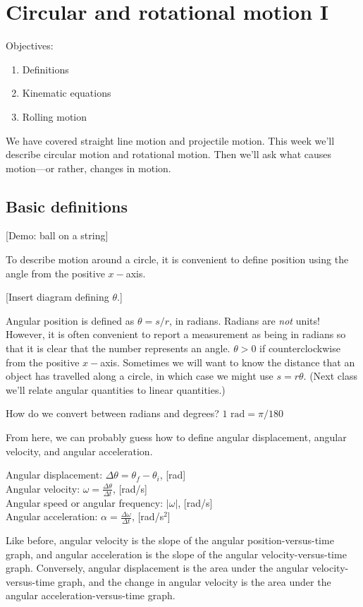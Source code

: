 \section{Circular and rotational motion I}
Objectives:
\begin{enumerate}
\item Definitions
\item Kinematic equations
\item Rolling motion
\end{enumerate}

We have covered straight line motion and projectile motion. This week we'll describe circular motion and rotational motion. Then we'll ask what causes motion---or rather, changes in motion.

\subsection{Basic definitions}
[Demo: ball on a string]

To describe motion around a circle, it is convenient to define position using the angle from the positive $x-$axis.

[Insert diagram defining $\theta$.]
\vspace{5cm}

Angular position is defined as $\theta=s/r$, in radians. Radians are \textit{not} units! However, it is often convenient to report a measurement as being in radians so that it is clear that the number represents an angle. $\theta>0$ if counterclockwise from the positive $x-$axis. Sometimes we will want to know the distance that an object has travelled along a circle, in which case we might use $s=r\theta$. (Next class we'll relate angular quantities to linear quantities.)

How do we convert between radians and degrees? $1\mbox{ rad}=\pi/180$

From here, we can probably guess how to define angular displacement, angular velocity, and angular acceleration.

Angular displacement: $\Delta{\theta}=\theta_f-\theta_i$, [rad]\\
Angular velocity: $\omega=\frac{\Delta\theta}{\Delta{t}}$, [rad/s]\\
Angular speed or angular frequency: $|\omega|$, [rad/s]\\
Angular acceleration: $\alpha=\frac{\Delta\omega}{\Delta{t}}$, [rad/s$^2$]

Like before, angular velocity is the slope of the angular position-versus-time graph, and angular acceleration is the slope of the angular velocity-versus-time graph. Conversely, angular displacement is the area under the angular velocity-versus-time graph, and the change in angular velocity is the area under the angular acceleration-versus-time graph. 

